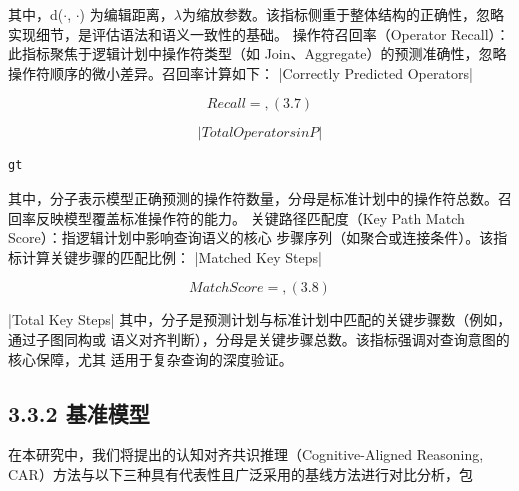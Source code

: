 \documentclass[12pt,a4paper,openright,UTF8]{ctexbook}
\begin{document}
其中，d($\cdot$, $\cdot$) 为编辑距离，$\lambda$为缩放参数。该指标侧重于整体结构的正确性，忽略 实现细节，是评估语法和语义一致性的基础。 操作符召回率（Operator Recall）：此指标聚焦于逻辑计划中操作符类型（如 Join、Aggregate）的预测准确性，忽略操作符顺序的微小差异。召回率计算如下： |Correctly Predicted Operators|

\begin{equation*}
Recall =,(3.7)
\end{equation*}

\begin{equation*}
|Total Operators in P|
\end{equation*}

\begin{lstlisting}
gt
\end{lstlisting}
其中，分子表示模型正确预测的操作符数量，分母是标准计划中的操作符总数。召 回率反映模型覆盖标准操作符的能力。 关键路径匹配度（Key Path Match Score）：指逻辑计划中影响查询语义的核心 步骤序列（如聚合或连接条件）。该指标计算关键步骤的匹配比例： |Matched Key Steps|

\begin{equation*}
Match Score =,(3.8)
\end{equation*}

|Total Key Steps| 其中，分子是预测计划与标准计划中匹配的关键步骤数（例如，通过子图同构或 语义对齐判断），分母是关键步骤总数。该指标强调对查询意图的核心保障，尤其 适用于复杂查询的深度验证。

\subsection{3.3.2 基准模型}

在本研究中，我们将提出的认知对齐共识推理（Cognitive-Aligned Reasoning, CAR）方法与以下三种具有代表性且广泛采用的基线方法进行对比分析，包
\end{document}
